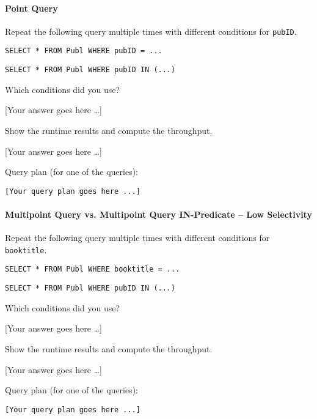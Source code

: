 \documentclass[11pt]{scrartcl}
\newcommand{\youranswerhere}{[Your answer goes here \ldots]}
\begin{document}
\paragraph{Point Query}

Repeat the following query multiple times with different conditions for \texttt{pubID}.

\begin{lstlisting}[style=dbtsql]
SELECT * FROM Publ WHERE pubID = ...
\end{lstlisting}

\begin{lstlisting}[style=dbtsql]
SELECT * FROM Publ WHERE pubID IN (...)
\end{lstlisting}


Which conditions did you use?

\youranswerhere{}

Show the runtime results and compute the throughput.

\youranswerhere{}

Query plan (for one of the queries):

{\small
\parskip0pt\begin{verbatim}
[Your query plan goes here ...]
\end{verbatim}}

\paragraph{Multipoint Query vs. Multipoint Query IN-Predicate -- Low Selectivity}

Repeat the following query multiple times with different conditions for \texttt{booktitle}.

\begin{lstlisting}[style=dbtsql]
SELECT * FROM Publ WHERE booktitle = ...
\end{lstlisting}

\begin{lstlisting}[style=dbtsql]
SELECT * FROM Publ WHERE pubID IN (...)
\end{lstlisting}

Which conditions did you use?

\youranswerhere{}

Show the runtime results and compute the throughput.

\youranswerhere{}

Query plan (for one of the queries):

{\small
\parskip0pt\begin{verbatim}
[Your query plan goes here ...]
\end{verbatim}}
\end{document}

